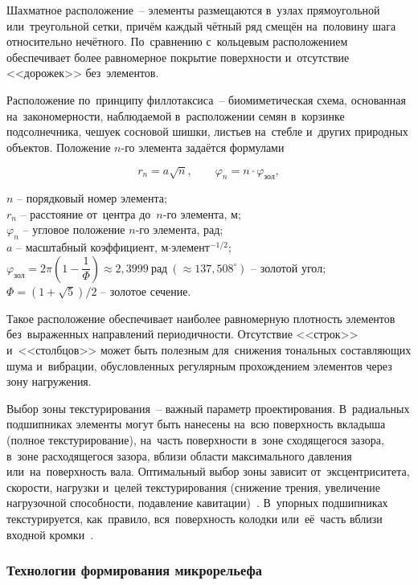 Шахматное расположение~-- элементы размещаются в~узлах прямоугольной или~треугольной сетки, причём каждый чётный ряд смещён на~половину шага относительно нечётного. По~сравнению с~кольцевым расположением обеспечивает более равномерное покрытие поверхности и~отсутствие <<дорожек>> без~элементов.

Расположение по~принципу филлотаксиса~-- биомиметическая схема, основанная на~закономерности, наблюдаемой в~расположении семян в~корзинке подсолнечника, чешуек сосновой шишки, листьев на~стебле и~других природных объектов. Положение $n$-го элемента задаётся формулами

\begin{equation}
r_n = a\sqrt{n}, \qquad \varphi_n = n \cdot \varphi_{\text{зол}},
\end{equation}
\begin{conditions}
$n$ -- порядковый номер элемента;\\
$r_n$ -- расстояние от~центра до~$n$-го элемента, м;\\
$\varphi_n$ -- угловое положение $n$-го элемента, рад;\\
$a$ -- масштабный коэффициент, м$\cdot$элемент$^{-1/2}$;\\
$\varphi_{\text{зол}} = 2\pi\left(1 - \dfrac{1}{\Phi}\right) \approx 2{,}3999~\text{рад} \ (\approx 137{,}508^{\circ})$ -- золотой угол;\\
$\Phi = (1+\sqrt{5})/2$ -- золотое сечение.
\end{conditions}
Такое расположение обеспечивает наиболее равномерную плотность элементов без~выраженных направлений периодичности. Отсутствие <<строк>> и~<<столбцов>> может быть полезным для~снижения тональных составляющих шума и~вибрации, обусловленных регулярным прохождением элементов через зону нагружения.

Выбор зоны текстурирования~-- важный параметр проектирования. В~радиальных подшипниках элементы могут быть нанесены на~всю поверхность вкладыша (полное текстурирование), на~часть поверхности в~зоне сходящегося зазора, в~зоне расходящегося зазора, вблизи области максимального давления или~на~поверхность вала. Оптимальный выбор зоны зависит от~эксцентриситета, скорости, нагрузки и~целей текстурирования (снижение трения, увеличение нагрузочной способности, подавление кавитации)~\cite{yazhou2024,profito2024}. В~упорных подшипниках текстурируется, как~правило, вся~поверхность колодки или~её~часть вблизи входной кромки~\cite{gropper2018}.

\subsubsection{Технологии формирования микрорельефа}

